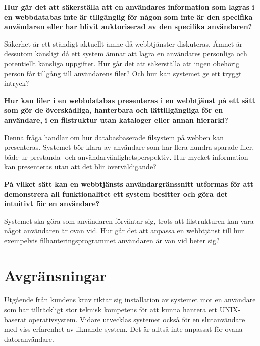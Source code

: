 \textbf{Hur går det att säkerställa att en användares information som lagras i en webbdatabas inte är tillgänglig för någon som inte är den specifika användaren eller har blivit  auktoriserad av den specifika användaren?}

Säkerhet är ett ständigt aktuellt ämne då webbtjänster diskuteras. Ämnet är dessutom känsligt då ett system ämnar att lagra en användares personliga och potentiellt känsliga uppgifter. Hur går det att säkerställa att ingen obehörig person får tillgång till användarens filer? Och hur kan systemet ge ett tryggt intryck?

\textbf{Hur kan filer i en webbdatabas presenteras i en webbtjänst på ett sätt som gör de överskådliga, hanterbara och lättillgängliga för en användare, i en filstruktur utan kataloger eller annan hierarki?}

Denna fråga handlar om hur databasbaserade filsystem på webben kan presenteras. Systemet bör klara av användare som har flera hundra sparade filer, både ur prestanda- och användarvänlighetsperspektiv. Hur mycket information kan presenteras utan att det blir överväldigande?

\textbf{På vilket sätt kan en webbtjänsts användargränssnitt utformas för att demonstrera all funktionalitet ett system besitter och göra det intuitivt för en användare?}

Systemet ska göra som användaren förväntar sig, trots att filstrukturen kan vara något användaren är ovan vid. Hur går det att anpassa en webbtjänst till hur exempelvis filhanteringsprogrammet användaren är van vid beter sig?

\section{Avgränsningar}
Utgående från kundens krav riktar sig installation av systemet mot en användare som har tillräckligt stor teknisk kompetens för att kunna hantera ett UNIX-baserat operativsystem. Vidare utvecklas systemet också för en slutanvändare med viss erfarenhet av liknande system. Det är alltså inte anpassat för ovana datoranvändare.

